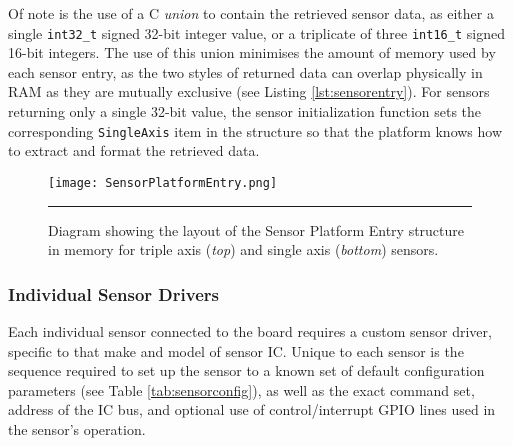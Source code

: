 

Of note is the use of a C \textit{union} to contain the retrieved sensor data, as either a single \lstinline{int32_t} signed 32-bit integer value, or a triplicate of three \lstinline{int16_t} signed 16-bit integers. The use of this union minimises the amount of memory used by each sensor entry, as the two styles of returned data can overlap physically in RAM as they are mutually exclusive (see Listing \ref{lst:sensorentry}). For sensors returning only a single 32-bit value, the sensor initialization function sets the corresponding \lstinline{SingleAxis} item in the structure so that the platform knows how to extract and format the retrieved data.

\begin{figure}[tbph]
	\vspace{1em}
	\centering
		\texttt{[image: SensorPlatformEntry.png]}
	\rule{35em}{0.5pt}
	\caption[Sensor Platform Entry Structure Diagram]{Diagram showing the layout of the Sensor Platform Entry structure in memory for triple axis (\textit{top}) and single axis (\textit{bottom}) sensors.}
	\label{fig:sensorentry}
\end{figure}

\FloatBarrier
\subsubsection{Individual Sensor Drivers}

Each individual sensor connected to the board requires a custom sensor driver, specific to that make and model of sensor IC. Unique to each sensor is the sequence required to set up the sensor to a known set of default configuration parameters (see Table \ref{tab:sensorconfig}), as well as the exact command set, address of the IC bus, and optional use of control/interrupt GPIO lines used in the sensor's operation.

